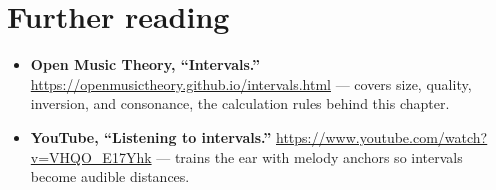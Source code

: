 \section*{Further reading}
\begin{itemize}
  \item \textbf{Open Music Theory, “Intervals.”} \url{https://openmusictheory.github.io/intervals.html} — covers size, quality, inversion, and consonance, the calculation rules behind this chapter.
  \item \textbf{YouTube, “Listening to intervals.”} \url{https://www.youtube.com/watch?v=VHQO_E17Yhk} — trains the ear with melody anchors so intervals become audible distances.
\end{itemize}


